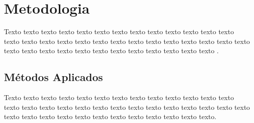 \chapter{Metodologia}

Texto texto texto texto texto texto texto texto texto texto texto texto texto texto texto texto texto texto texto texto texto texto texto texto texto texto texto texto texto texto texto texto texto texto texto texto texto texto texto \cite{ref:Nuseibeh}.

\section{Métodos Aplicados}

Texto texto texto texto texto texto texto texto texto texto texto texto texto texto texto texto texto texto texto texto texto texto texto texto texto texto texto texto texto texto texto texto texto texto texto texto texto texto texto.
